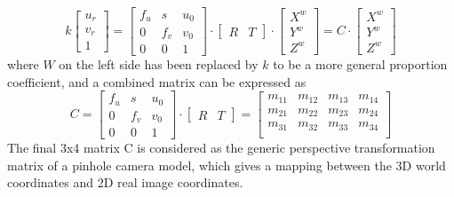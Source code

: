 \begin{equation}
%
k \left[ \begin{array}{c} u_r \\ v_r \\ 1 \end{array} \right] %
=  \begin{bmatrix} f_u & s & u_0 \\ 0 & f_v & v_0 \\ 0 & 0 & 1 \end{bmatrix} \cdot%
\begin{bmatrix} R & T \end{bmatrix} \cdot \left[ \begin{array}{c} X^w \\ Y^w \\ Z^w \end{array} \right]%
=  C \cdot \left[ \begin{array}{c} X^w \\ Y^w \\ Z^w \end{array} \right]%
%
\end{equation}%
%
where \(W\) on the left side has been replaced by \(k\) to be a more general proportion coefficient, and a combined matrix can be expressed as
\begin{equation}
%
C %
=  \begin{bmatrix} f_u & s & u_0 \\ 0 & f_v & v_0 \\ 0 & 0 & 1 \end{bmatrix} \cdot%
\begin{bmatrix} R & T \end{bmatrix}%
= \begin{bmatrix} 
m_{11} & m_{12} & m_{13} & m_{14} \\
m_{21} & m_{22} & m_{23} & m_{24} \\
m_{31} & m_{32} & m_{33} & m_{34} \\
\end{bmatrix}%
%
\label{genericPerspectivePinholeMatrix}
\end{equation}%
%
The final 3x4 matrix C is considered as the generic perspective transformation matrix of a pinhole camera model, which gives a mapping between the 3D world coordinates and 2D real image coordinates.\par

